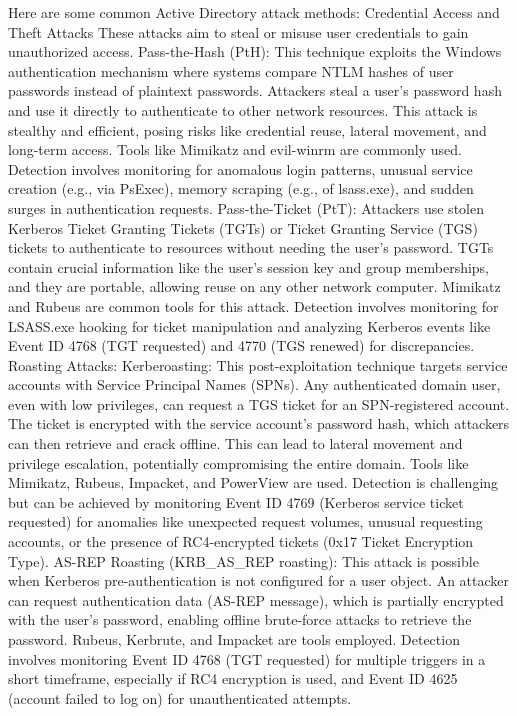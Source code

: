 Here are some common Active Directory attack methods:
Credential Access and Theft Attacks These attacks aim to steal or misuse user credentials to gain unauthorized access.
Pass-the-Hash (PtH): This technique exploits the Windows authentication mechanism where systems compare NTLM hashes of user passwords instead of plaintext passwords. Attackers steal a user's password hash and use it directly to authenticate to other network resources. This attack is stealthy and efficient, posing risks like credential reuse, lateral movement, and long-term access. Tools like Mimikatz and evil-winrm are commonly used. Detection involves monitoring for anomalous login patterns, unusual service creation (e.g., via PsExec), memory scraping (e.g., of lsass.exe), and sudden surges in authentication requests.
Pass-the-Ticket (PtT): Attackers use stolen Kerberos Ticket Granting Tickets (TGTs) or Ticket Granting Service (TGS) tickets to authenticate to resources without needing the user's password. TGTs contain crucial information like the user's session key and group memberships, and they are portable, allowing reuse on any other network computer. Mimikatz and Rubeus are common tools for this attack. Detection involves monitoring for LSASS.exe hooking for ticket manipulation and analyzing Kerberos events like Event ID 4768 (TGT requested) and 4770 (TGS renewed) for discrepancies.
Roasting Attacks:
Kerberoasting: This post-exploitation technique targets service accounts with Service Principal Names (SPNs). Any authenticated domain user, even with low privileges, can request a TGS ticket for an SPN-registered account. The ticket is encrypted with the service account's password hash, which attackers can then retrieve and crack offline. This can lead to lateral movement and privilege escalation, potentially compromising the entire domain. Tools like Mimikatz, Rubeus, Impacket, and PowerView are used. Detection is challenging but can be achieved by monitoring Event ID 4769 (Kerberos service ticket requested) for anomalies like unexpected request volumes, unusual requesting accounts, or the presence of RC4-encrypted tickets (0x17 Ticket Encryption Type).
AS-REP Roasting (KRB\_AS\_REP roasting): This attack is possible when Kerberos pre-authentication is not configured for a user object. An attacker can request authentication data (AS-REP message), which is partially encrypted with the user's password, enabling offline brute-force attacks to retrieve the password. Rubeus, Kerbrute, and Impacket are tools employed. Detection involves monitoring Event ID 4768 (TGT requested) for multiple triggers in a short timeframe, especially if RC4 encryption is used, and Event ID 4625 (account failed to log on) for unauthenticated attempts.
